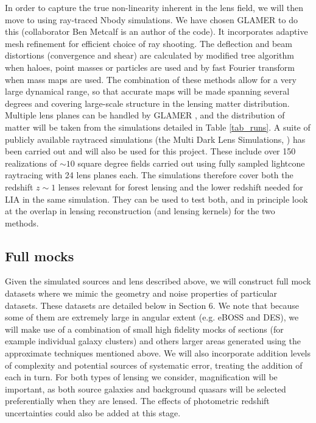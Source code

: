 \documentclass[12pt]{article}
\begin{document}
\begin{small}
In order to capture the true non-linearity inherent in the lens field,
 we will then move to using ray-traced  Nbody simulations. We have chosen  
GLAMER   \cite{metcalf2014} to do this (collaborator Ben Metcalf is an 
author of the code). It incorporates adaptive mesh refinement for
efficient choice of ray shooting. The deflection and beam distortions 
(convergence and shear) are calculated by modified tree algorithm when haloes,
 point masses or particles are used and by fast Fourier transform when 
mass maps are used. The combination of these methods allow for a very 
large dynamical range, so that accurate  maps will be made
spanning several degrees and covering large-scale
structure in the lensing matter distribution. Multiple lens planes can be
handled by GLAMER \cite{petkova2014}, and the distribution of matter
will be taken from the simulations detailed in Table \ref{tab_runs}. A suite 
of publicly available raytraced simulations (the Multi Dark Lens Simulations,
\cite{giocoli2016}) has been carried out and will also be used for 
this project. These include over 150 realizations of $\sim 10$ square
degree fields carried out using fully sampled lightcone raytracing
with 24 lens planes each. The simulations therefore cover both the
redshift $z\sim1$ lenses relevant for forest lensing and the lower 
redshift needed for LIA in the same simulation. They can be used to
test both, and in principle look at the overlap in lensing reconstruction
(and lensing kernels) for the two methods. 


\subsection{Full mocks}

Given the simulated sources and lens described above, we will construct
full mock datasets where we mimic the geometry and noise properties
of particular datasets. These datasets are detailed below in Section 6.
We note that because some of them are extremely large in
angular extent (e.g. eBOSS and DES), we will make use of a combination of
small high fidelity mocks of sections (for example individual 
galaxy clusters) and others larger areas generated using the approximate 
techniques mentioned above.
We will also incorporate addition levels of
complexity and potential sources of systematic
error, treating the addition of each in turn. For both types of
lensing we consider, magnification will be important, as both source
galaxies and background quasars will be selected preferentially when
they are lensed. The effects of photometric redshift uncertainties
could also  be added 
at this stage.   



\end{small}
\end{document}
